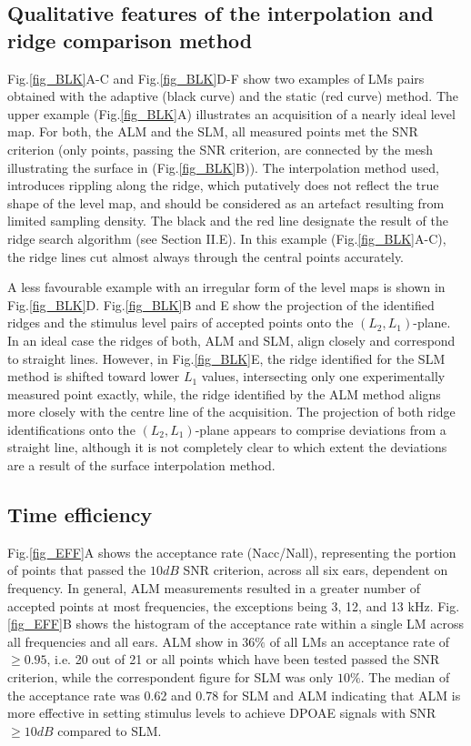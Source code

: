 \documentclass[journal,twoside,web]{ieeecolor2}
\begin{document}
\subsection{Qualitative features of the interpolation and ridge comparison method}
Fig.\ref{fig_BLK}A-C and Fig.\ref{fig_BLK}D-F show two examples of LMs pairs obtained with the adaptive (black curve) and the static (red curve) method.
The upper example (Fig.\ref{fig_BLK}A) illustrates an acquisition of a nearly ideal level map.
For both, the ALM and the SLM, all measured points met the SNR criterion (only points, passing the SNR criterion, are connected by the mesh illustrating the surface in (Fig.\ref{fig_BLK}B)).
The interpolation method used, introduces rippling along the ridge, which putatively does not reflect the true shape of the level map, and should be considered as an artefact resulting from limited sampling density.
The black and the red line designate the result of the ridge search algorithm (see Section II.E).
In this example (Fig.\ref{fig_BLK}A-C), the ridge lines cut almost always through the central points accurately.


A less favourable example with an irregular form of the level maps  is shown in Fig.\ref{fig_BLK}D.
Fig.\ref{fig_BLK}B and E show the projection of the identified ridges and the stimulus level pairs of accepted points onto the $(L_2, L_1)$-plane.
In an ideal case the ridges of both, ALM and SLM, align closely and correspond to straight lines.
However, in Fig.\ref{fig_BLK}E,  the ridge identified for the SLM method is shifted toward lower $L_1$ values, intersecting only one experimentally measured point exactly, while, the ridge identified by the ALM method aligns more closely with the centre line of the acquisition.
The projection of both ridge identifications onto the $(L_2, L_1)$-plane appears to comprise deviations from a straight line, although it is not completely clear to which extent the deviations are a result of the surface interpolation method.

\subsection{Time efficiency}
Fig.\ref{fig_EFF}A shows the acceptance rate (Nacc/Nall), representing the portion of points that passed the $10 dB$ SNR criterion, across all six ears, dependent on frequency.
In general, ALM measurements resulted in a greater number of accepted points at most frequencies, the exceptions being 3, 12, and 13 kHz.
Fig.\ref{fig_EFF}B shows the histogram of the acceptance rate within a single LM across all frequencies and all ears.
ALM show in $36\%$ of all LMs an acceptance rate of $\ge 0.95$, i.e. 20 out of 21 or all points which have been tested passed the SNR criterion, while the correspondent figure for SLM was only $10\%$.
The median of the acceptance rate was 0.62 and 0.78 for SLM and ALM indicating that ALM is more effective in setting stimulus levels to achieve DPOAE signals with SNR $\ge10 dB$ compared to SLM.
\end{document}
